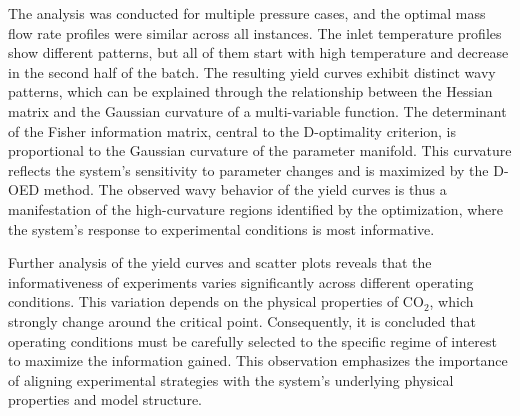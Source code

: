 \documentclass[a4paper,fleqn]{cas-dc}
\begin{document}
The analysis was conducted for multiple pressure cases, and the optimal mass flow rate profiles were similar across all instances. The inlet temperature profiles show different patterns, but all of them start with high temperature and decrease in the second half of the batch. The resulting yield curves exhibit distinct wavy patterns, which can be explained through the relationship between the Hessian matrix and the Gaussian curvature of a multi-variable function. The determinant of the Fisher information matrix, central to the D-optimality criterion, is proportional to the Gaussian curvature of the parameter manifold. This curvature reflects the system's sensitivity to parameter changes and is maximized by the D-OED method. The observed wavy behavior of the yield curves is thus a manifestation of the high-curvature regions identified by the optimization, where the system's response to experimental conditions is most informative.

Further analysis of the yield curves and scatter plots reveals that the informativeness of experiments varies significantly across different operating conditions. This variation depends on the physical properties of CO$_2$, which strongly change around the critical point. Consequently, it is concluded that operating conditions must be carefully selected to the specific regime of interest to maximize the information gained. This observation emphasizes the importance of aligning experimental strategies with the system's underlying physical properties and model structure.

\clearpage
\newpage
%



%

\clearpage
\newpage
\end{document}
